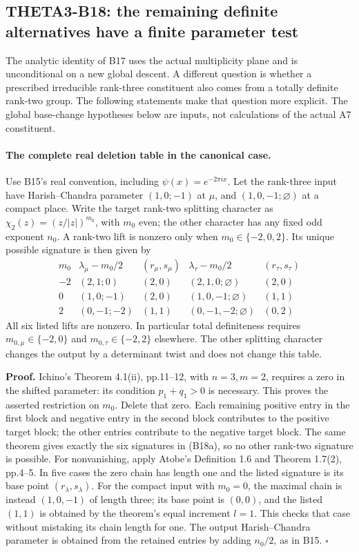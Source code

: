 \documentclass[11pt]{article}
\theoremstyle{definition}\newtheorem{definition}[theorem]{Definition}\newtheorem{remark}[theorem]{Remark}
\begin{document}
\subsection{THETA3-B18: the remaining definite alternatives have a finite parameter test}\label{B18}

The analytic identity of B17 uses the actual multiplicity plane and
is unconditional on a new global descent. A different question is
whether a prescribed irreducible rank-three constituent also comes
from a totally definite rank-two group. The following statements
make that question more explicit. The global base-change hypotheses
below are inputs, not calculations of the actual A7 constituent.

\paragraph{The complete real deletion table in the canonical case.}
Use B15's real convention, including $\psi(x)=e^{-2\pi i x}$.
Let the rank-three input have Harish--Chandra parameter
$(1,0;-1)$ at $\mu$, and $(1,0,-1;\varnothing)$ at a compact
place. Write the target rank-two splitting character as
$\chi_2(z)=(z/|z|)^{m_0}$, with $m_0$ even; the other character
has any fixed odd exponent $n_0$. A rank-two lift is nonzero
only when $m_0\in\{-2,0,2\}$. Its unique possible signature is
then given by
\[
\begin{array}{c|c|c|c|c}
 m_0&\lambda_\mu-m_0/2&(r_\mu,s_\mu)
       &\lambda_\tau-m_0/2&(r_\tau,s_\tau)\\ \hline
 -2&(2,1;0)&(2,0)&(2,1,0;\varnothing)&(2,0)\\
 0 &(1,0;-1)&(2,0)&(1,0,-1;\varnothing)&(1,1)\\
 2 &(0,-1;-2)&(1,1)&(0,-1,-2;\varnothing)&(0,2)
\end{array}
\tag{B18a}
\]
All six listed lifts are nonzero. In particular total definiteness
requires $m_{0,\mu}\in\{-2,0\}$ and
$m_{0,\tau}\in\{-2,2\}$ elsewhere. The other splitting character
changes the output by a determinant twist and does not change this
table.

\textbf{Proof.}
Ichino's Theorem 4.1(ii), pp.11--12, with $n=3,m=2$, requires a
zero in the shifted parameter: its condition $p_1+q_1>0$ is
necessary. This proves the asserted restriction on $m_0$.
Delete that zero. Each remaining positive entry in the first
block and negative entry in the second block contributes to the
positive target block; the other entries contribute to the
negative target block. The same theorem gives exactly the six
signatures in (B18a), so no other rank-two signature is possible.
For nonvanishing, apply Atobe's Definition 1.6 and Theorem 1.7(2),
pp.4--5. In five cases the zero chain has length one and the
listed signature is its base point $(r_\lambda,s_\lambda)$.
For the compact input with $m_0=0$, the maximal chain is instead
$(1,0,-1)$ of length three; its base point is $(0,0)$, and the
listed $(1,1)$ is obtained by the theorem's equal increment
$l=1$. This checks that case without mistaking its chain length
for one. The output Harish--Chandra parameter is obtained from
the retained entries by adding $n_0/2$, as in B15.
\hfill$\square$
\end{document}
